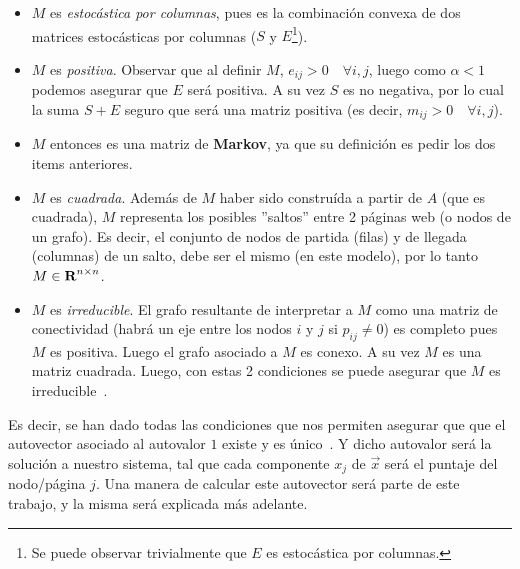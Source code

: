 \begin{itemize}
    \item $M$ es \textit{estoc\'astica por columnas}, pues es la combinaci\'on convexa de
        dos matrices estoc\'asticas por columnas ($S$ y $E$\footnote{Se puede
        observar trivialmente que $E$ es estoc\'astica por columnas.}).

    \item $M$ es \textit{positiva}. Observar que al definir $M$, $e_{ij} >
        0\quad\forall i,j$, luego como $\alpha < 1$ podemos asegurar que $E$
        ser\'a positiva. A su vez $S$ es no negativa, por lo cual la suma $S+E$
        seguro que ser\'a una matriz positiva (es decir, $m_{ij} > 0
        \quad\forall i,j$).

    \item $M$ entonces es una matriz de \textbf{Markov}, ya que su definici\'on
        es pedir los dos items anteriores.

    \item $M$ es \textit{cuadrada}. Adem\'as de $M$ haber sido constru\'ida a
        partir de $A$ (que es cuadrada), $M$ representa los posibles ''saltos''
        entre 2 p\'aginas web (o nodos de un grafo). Es decir, el conjunto de
        nodos de partida (filas) y de llegada (columnas) de un salto, debe ser
        el mismo (en este modelo), por lo tanto $M\in\hbox{\bf R}^{n\times n}$.

    \item $M$ es \textit{irreducible}. El grafo resultante de interpretar a $M$
        como una matriz de conectividad (habr\'a un eje entre los nodos $i$ y
        $j$ si $p_{ij}\neq 0$) es completo pues $M$ es positiva.  Luego el grafo
        asociado a $M$ es conexo. A su vez $M$ es una matriz cuadrada. Luego,
        con estas 2 condiciones se puede asegurar que $M$ es
        irreducible~\cite[p.671]{Meyer2000}.
\end{itemize}
\smallskip

\par Es decir, se han dado todas las condiciones que nos permiten asegurar que
que el autovector asociado al autovalor $1$ existe y es
\'unico~\cite[p.663-693]{Meyer2000}. Y dicho autovalor ser\'a la soluci\'on a
nuestro sistema, tal que cada componente $x_j$ de $\overrightarrow{x}$ ser\'a el
puntaje del nodo/p\'agina $j$. Una manera de calcular este autovector ser\'a
parte de este trabajo, y la misma ser\'a explicada m\'as adelante.


